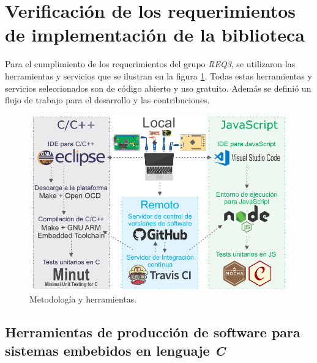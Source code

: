 \section{Verificación de los requerimientos de implementación de la biblioteca}

Para el cumplimiento de los requerimientos del grupo \emph{REQ3}, se utilizaron las herramientas y servicios que se ilustran en la figura \ref{fig:ciTools}. Todas estas herramientas y servicios seleccionados son de código abierto y uso gratuito. Además se definió un flujo de trabajo para el desarrollo y las contribuciones.

\begin{figure}[!htbp]
\begin{center}  %
\includegraphics*[width=14cm]{Figures/ciTools.pdf}
\par\caption{Metodología y herramientas.}\label{fig:ciTools}
\end{center}
\end{figure}

\subsection{Herramientas de producción de software para sistemas embebidos en lenguaje \emph{C}}

